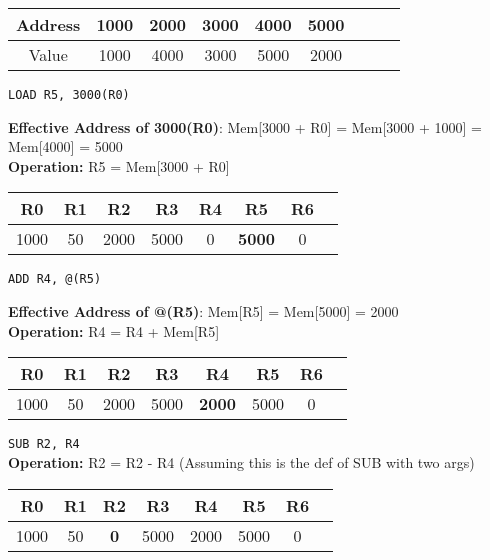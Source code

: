\documentclass[a4paper, 15pt]{exam}
\begin{document}
\begin{enumerate}
 \begin{center}
 	\begin{tabular}{ |c|c|c|c|c|c|c|c|c|} 
 		\hline
 		
 		Address&1000 & 2000 & 3000& 4000 & 5000 \\ 
 		\hline
 		Value&1000 & 4000 & 3000 & 5000 & 2000 \\ 
 		\hline
 	\end{tabular}
 \end{center}
 
 \verb|LOAD R5, 3000(R0)|
 
 \textbf{Effective Address of 3000(R0)}: Mem[3000 + R0] = Mem[3000 + 1000] = Mem[4000] = 5000 \\
 \textbf{Operation:} R5 = Mem[3000 + R0]
 
 \begin{center}
 	\begin{tabular}{ |c|c|c|c|c|c|c|c|} 
 		\hline
 		R0 & R1 & R2& R3 & R4 &R5&R6\\ 
 		\hline
 		1000 & 50 & 2000 & 5000 &0 & \textbf{5000} & 0\\ 
 		\hline
 	\end{tabular}
 \end{center}

\verb|ADD R4, @(R5)|

\textbf{Effective Address of @(R5)}: Mem[R5] = Mem[5000] = 2000 \\
\textbf{Operation:} R4 = R4 + Mem[R5]

\begin{center}
 	\begin{tabular}{ |c|c|c|c|c|c|c|c|} 
 		\hline
 		R0 & R1 & R2& R3 & R4 &R5&R6\\ 
 		\hline
 		1000 & 50 & 2000 & 5000 &\textbf{2000} & 5000 & 0\\ 
 		\hline
 	\end{tabular}
 \end{center}

\verb|SUB R2, R4| \\
\textbf{Operation:} R2 = R2 - R4 (Assuming this is the def of SUB with two args)

\begin{center}
 	\begin{tabular}{ |c|c|c|c|c|c|c|c|} 
 		\hline
 		R0 & R1 & R2& R3 & R4 &R5&R6\\ 
 		\hline
 		1000 & 50 & \textbf{0} & 5000 & 2000 & 5000 & 0\\ 
 		\hline
 	\end{tabular}
 \end{center}
 

\end{enumerate}
\end{document}
